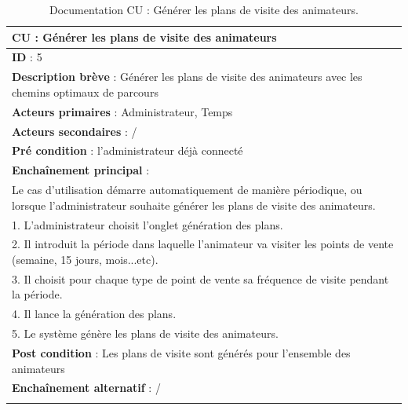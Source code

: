 \renewcommand{\arraystretch}{1.5}
\begin{xltabular}{\linewidth}{|X|}
    \hline
    \textbf{CU} : Générer les plans de visite des animateurs     \\\hline
    \textbf{ID} :  5   \\\hline
    \textbf{Description brève} : Générer les plans de visite des animateurs avec les chemins optimaux de parcours  \\\hline
    \textbf{Acteurs primaires} : Administrateur, Temps     \\\hline
    \textbf{Acteurs secondaires} :  /    \\\hline
    \textbf{Pré condition} :  l'administrateur déjà connecté    \\\hline
    \textbf{Enchaînement principal} : \\
    Le cas d'utilisation démarre automatiquement de manière périodique, ou lorsque l'administrateur souhaite générer les plans de visite des animateurs. \\
    1. L'administrateur choisit l'onglet génération des plans. \\
    2. Il introduit la période dans laquelle l'animateur va visiter les points de vente (semaine, 15 jours, mois...etc). \\
    3. Il choisit pour chaque type de point de vente sa fréquence de visite pendant la période. \\
    4. Il lance la génération des plans. \\
    5. Le système génère les plans de visite des animateurs. 
    \\\hline
    \textbf{Post condition} :  Les plans de visite sont générés pour l'ensemble des animateurs   \\\hline
    \textbf{Enchaînement alternatif} :   /   \\\hline
  
    \caption{Documentation CU : Générer les plans de visite des animateurs.}
    \label{tab:cu-specs1}
\end{xltabular}
\FloatBarrier

\clearpage

